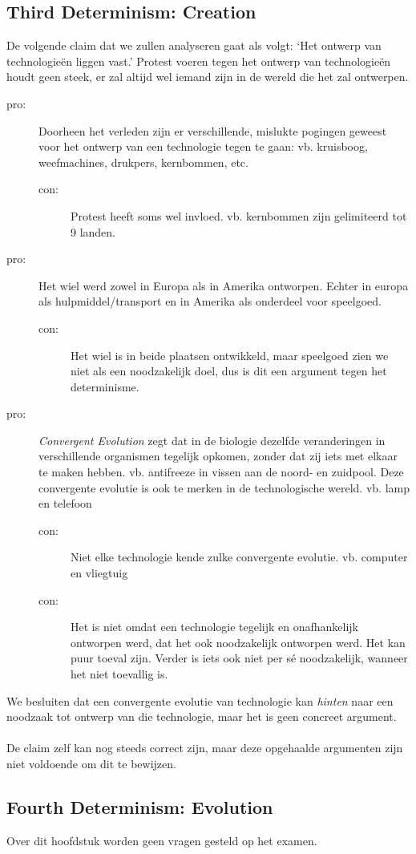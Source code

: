 \documentclass[../summary.tex]{subfiles}
\begin{document}
	\subsection{Third Determinism: Creation}
	De volgende claim dat we zullen analyseren gaat als volgt: `Het ontwerp van technologieën liggen vast.' Protest voeren tegen het ontwerp van technologieën houdt geen steek, er zal altijd wel iemand zijn in de wereld die het zal ontwerpen.
	\begin{description}
		\item[pro:] Doorheen het verleden zijn er verschillende, mislukte pogingen geweest voor het ontwerp van een technologie tegen te gaan: vb. kruisboog, weefmachines, drukpers, kernbommen, etc.
		\begin{description}
			\item[con:] Protest heeft soms wel invloed. vb. kernbommen zijn gelimiteerd tot 9 landen.
		\end{description}
		\item[pro:] Het wiel werd zowel in Europa als in Amerika ontworpen. Echter in europa als hulpmiddel/transport en in Amerika als onderdeel voor speelgoed.
		\begin{description}
			\item[con:] Het wiel is in beide plaatsen ontwikkeld, maar speelgoed zien we niet als een noodzakelijk doel, dus is dit een argument tegen het determinisme. 
		\end{description}
		\item[pro:] \emph{Convergent Evolution} zegt dat in de biologie dezelfde veranderingen in verschillende organismen tegelijk opkomen, zonder dat zij iets met elkaar te maken hebben. vb. antifreeze in vissen aan de noord- en zuidpool. Deze convergente evolutie is ook te merken in de technologische wereld. vb. lamp en telefoon
		\begin{description}
			\item[con:] Niet elke technologie kende zulke convergente evolutie. vb. computer en vliegtuig
			\item[con:] Het is niet omdat een technologie tegelijk en onafhankelijk ontworpen werd, dat het ook noodzakelijk ontworpen werd. Het kan puur toeval zijn. Verder is iets ook niet per sé noodzakelijk, wanneer het niet toevallig is.
		\end{description}
	\end{description}
	We besluiten dat een convergente evolutie van technologie kan \emph{hinten} naar een noodzaak tot ontwerp van die technologie, maar het is geen concreet argument.\\
	\\
	De claim zelf kan nog steeds correct zijn, maar deze opgehaalde argumenten zijn niet voldoende om dit te bewijzen.
	
	\subsection{Fourth Determinism: Evolution}
	Over dit hoofdstuk worden geen vragen gesteld op het examen.
		
\end{document}
